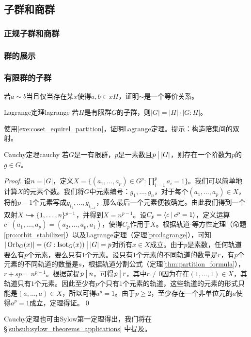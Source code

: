 \documentclass[../main.tex]{subfiles}
\begin{document}
\subsection{子群和商群}
\subsubsection{正规子群和商群}
\subsubsection{群的展示}
\subsubsection{有限群的子群}
\begin{exercise}\label{exe:coset_equirel_partition}
若$a\sim b$当且仅当存在某$x$使得$a,b\in xH$，证明$\sim$是一个等价关系。
\end{exercise}
\begin{proposition}{Lagrange定理}{lagrange}
若$H$是有限群$G$的子群，则$|G|=|H|\cdot|G:H|$。
\end{proposition}
\begin{exercise}
使用\ref{exe:coset_equirel_partition}，证明Lagrange定理。提示：构造陪集间的双射。
\end{exercise}
\begin{theorem}{Cauchy定理}{cauchy}
若$G$是一有限群，$p$是一素数且$p\mathbin{\big|}|G|$，则存在一个阶数为$p$的$g\in G$。
\end{theorem}
\begin{proof}
设$n=|G|$，定义$\displaystyle X=\{(a_1,\dots,a_p)\in G^p:\prod_{i=1}^pa_i=1\}$。我们可以简单地计算$X$的元素个数。我们将$G$中元素编号：$g_1,\dots,g_n$，对于每个$(a_1,\dots,a_p)\in X$，将前$p-1$个元素写成$g_{i_1},\dots,g_{i_{[-1}}$，那么最后一个元素便被确定。由此我们得到一个双射$X\hookrightarrow\mathrel{\mspace{-15mu}}\rightarrow\{1,\dots,n\}^{p-1}$，并得到$X=n^{p-1}$。设$C_p=\langle c\mathbin{|} c^p=1\rangle$，定义运算$c\cdot(a_1,\dots,a_p)=(a_2,\dots,a_p,a_1)$，使得$C_p$作用于$X$。根据轨道-等方性定理（命题\ref{pro:orbit_stabilizer}）以及Lagrange定理（定理\ref{pro:lagrange}），可知$|\operatorname{Orb}_G(x)|=(G:\operatorname{Isot}_G(x))\mathbin{\big|}|G|=p$对所有$x\in X$成立。由于$p$是素数，任何轨道要么有$p$个元素，要么只有$1$个元素。设只有$1$个元素的不同轨道的数量是$r$，有$p$个元素的不同轨道的数量是$s$，根据轨道分割公式（定理\ref{thm:partition_formula}），$r+sp=n^{p-1}$。根据前提$p\mathbin{\big|} n$，可得$p\mathbin{\big|} r$，其中$r\neq0$因为存在$(1,\dots,1)\in X$，其轨道只有$1$个元素。因此至少有$p$个只有$1$个元素的轨道，这些轨道的元素的形式只能是$(a,\dots,a)\in X$，所以可得$a^p=1$。由于$p\geq2$，至少存在一个非单位元的$a$使得$a^p=1$成立，定理得证。\qed
\end{proof}
\begin{remark}
Cauchy定理也可由Sylow第一定理得出，我们将在\S\ref{subsub:sylow_theorems_applications} 中提及。
\end{remark}
\end{document}
